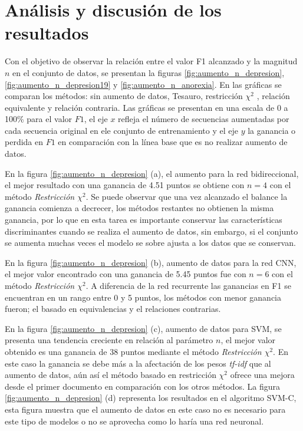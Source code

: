\section{Análisis y discusión de los resultados}

Con el objetivo de observar la relación entre el valor F1 alcanzado y la magnitud $n$ en el conjunto de datos, se presentan la figuras \ref{fig:aumento_n_depresion}, \ref{fig:aumento_n_depresion19} y \ref{fig:aumento_n_anorexia}. En las gráficas se comparan los métodos: sin aumento de datos, Tesauro, restricción $\chi^2$ , relación equivalente y relación contraria. Las gráficas se presentan en una escala de 0 a 100\% para el valor $F1$, el eje $x$ refleja el número de secuencias aumentadas por cada secuencia original en ele conjunto de entrenamiento y el eje $y$ la ganancia o perdida en $F1$ en comparación con la línea base que es no realizar aumento de datos. 

En la figura \ref{fig:aumento_n_depresion} (a), el aumento para la red bidireccional, el mejor resultado con una ganancia de 4.51 puntos se obtiene con $n=4$ con el método \textit{Restricción $\chi^2$}. Se puede observar que una vez alcanzado el balance la ganancia comienza a decrecer, los métodos restantes no obtienen la misma ganancia, por lo que en esta tarea es importante conservar las características discriminantes cuando se realiza el aumento de datos, sin embargo, si el conjunto se aumenta muchas veces el modelo se sobre ajusta a los datos que se conservan.

En la figura \ref{fig:aumento_n_depresion} (b), aumento de datos para la red CNN, el mejor valor encontrado con una ganancia de 5.45 puntos fue con $n=6$ con el método \textit{Restricción $\chi^2$}. A diferencia de la red recurrente las ganancias en F1 se encuentran en un rango entre 0 y 5 puntos, los métodos con menor ganancia fueron; el basado en equivalencias y el relaciones contrarias.

En la figura \ref{fig:aumento_n_depresion} (c), aumento de datos para SVM, se presenta una tendencia creciente en relación al parámetro $n$, el mejor valor obtenido es una ganancia de 38 puntos mediante el método \textit{Restricción $\chi^2$}. En este caso la ganancia se debe más a la afectación de los pesos \textit{tf-idf} que al aumento de datos, aún así el método basado en restricción $\chi^2$ ofrece una mejora desde el primer documento en comparación con los otros métodos. La figura \ref{fig:aumento_n_depresion} (d) representa los resultados en el algoritmo SVM-C, esta figura muestra que el aumento de datos en este caso no es necesario para este tipo de modelos o no se aprovecha como lo haría una red neuronal.

